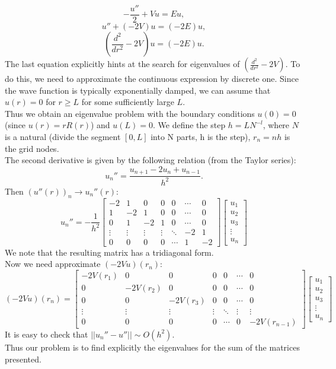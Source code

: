 \documentclass[a4paper, 14pt]{article}
\begin{document}
$$-\frac{u''}{2}+Vu = Eu,$$
$$u'' +(-2V)u = (-2E)u,$$
$$(\frac{d^2}{d r^2}-2V)u = (-2E)u.$$
The last equation explicitly hints at the search for eigenvalues of $(\frac{d^2}{d r^2}-2V)$. To do this, we need to approximate the continuous expression by discrete one. Since the wave function is typically exponentially damped, we can assume that $ u (r) = 0 $ for $ r \geq L $ for some sufficiently large $ L $. \\
Thus we obtain an eigenvalue problem with the boundary conditions $u(0) = 0$(since $ u (r) = r R (r) $) and $ u (L) = 0 $. We define the step $ h = L N ^{-l}$, where $ N $ is a natural (divide the segment $ [0, L] $ into N parts, h is the step), $ r_n = nh $ is the grid nodes.\\
The second derivative is given by the following relation (from the Taylor series): $$\displaystyle{{u_n''} = \frac{u_{n+1}-2u_n +u_{n-1}}{h^2}}.$$ 
Then $(u''(r))_n \to u_n''(r):$
$$\displaystyle{u_n'' = -\frac{1}{h^2} \begin{bmatrix}
-2 & 1 &0&0&0& \cdots & 0 \\
1 & -2 & 1& 0&0&\cdots & 0 \\  
0&1 & -2 & 1& 0&\cdots & 0 \\  
\vdots & \vdots &\vdots & \vdots & \ddots & -2& 1  \\
0 & 0&0 &0& \cdots &1 & -2
\end{bmatrix}
\begin{bmatrix}
u_1
\\
u_2
\\
u_3
\\
\vdots
\\
u_n
\end{bmatrix}}$$
We note that the resulting matrix has a tridiagonal form.\\
Now we need approximate $(-2Vu)(r_n)$:
$$(-2Vu)(r_n) = \begin{bmatrix}
-2V(r_1) & 0 &0&0&0& \cdots & 0 \\
0 & -2V(r_2) & 0& 0&0&\cdots & 0 \\  
0&0 & -2V(r_3) & 0& 0&\cdots & 0 \\  
\vdots & \vdots &\vdots & \vdots & \ddots & \vdots& \vdots  \\
0 & 0&0 &0& \cdots &0 & -2V(r_{n-1})
\end{bmatrix}
\begin{bmatrix}
u_1
\\
u_2
\\
u_3
\\
\vdots
\\
u_n
\end{bmatrix}$$
It is easy to check that $\displaystyle{||u_n''-u''|| \sim O(h^2)}.$\\
Thus our problem is to find explicitly the eigenvalues for the sum of the matrices presented.
\end{document}

